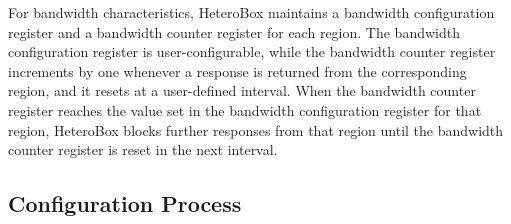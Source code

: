 

For bandwidth characteristics, HeteroBox maintains a bandwidth configuration register and a bandwidth counter register for each region. 
The bandwidth configuration register is user-configurable, while the bandwidth counter register increments by one whenever a response is returned from the corresponding region, and it resets at a user-defined interval. 
When the bandwidth counter register reaches the value set in the bandwidth configuration register for that region, HeteroBox blocks further responses from that region until the bandwidth counter register is reset in the next interval.


\subsection{Configuration Process}

